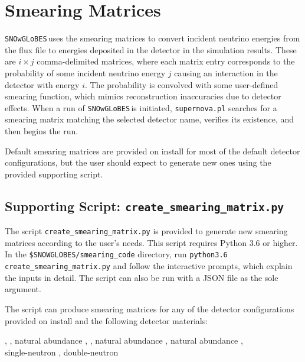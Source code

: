 \documentclass{article}
\newcommand{\snow}{\texttt{SNOwGLoBES}\,}
\begin{document}
\section{Smearing Matrices} \label{sec:smearmatrix}

\snow uses the smearing matrices to convert incident neutrino energies from the flux file to energies deposited in the detector in the simulation results. These are $i \times j$ comma-delimited matrices, where each matrix entry corresponds to the probability of some incident neutrino energy $j$ causing an interaction in the detector with energy $i$. The probability is convolved with some user-defined smearing function, which mimics reconstruction inaccuracies due to detector effects. When a run of \snow is initiated, \texttt{supernova.pl} searches for a smearing matrix matching the selected detector name, verifies its existence, and then begins the run.

Default smearing matrices are provided on install for most of the default detector configurations, but the user should expect to generate new ones using the provided supporting script.

\subsection{Supporting Script: \texttt{create\_smearing\_matrix.py}} \label{subsec:csm.py}

The script \texttt{create\_smearing\_matrix.py} is provided to generate new smearing matrices according to the user's needs. This script requires Python 3.6 or higher. In the \texttt{\$SNOWGLOBES/smearing\_code} directory, run 
\texttt{python3.6 create\_smearing\_matrix.py} and follow the interactive prompts,
which explain the inputs in detail. The script can also be run with a JSON file as the sole argument.

The script can produce smearing matrices for any of the detector configurations provided on install and the following detector materials:
 
\begin{adjustwidth}{2cm}{}
    \noindent {}, , natural abundance , , natural abundance , natural abundance , \\single-neutron , double-neutron 
\end{adjustwidth}
\end{document}
